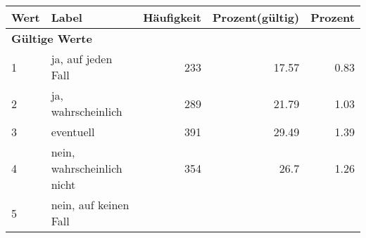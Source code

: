      \begin{longtable}{lXrrr}
     \toprule
     \textbf{Wert} & \textbf{Label} & \textbf{Häufigkeit} & \textbf{Prozent(gültig)} & \textbf{Prozent} \\
     \endhead
     \midrule
     \multicolumn{5}{l}{\textbf{Gültige Werte}}\\

     1 &
     \multicolumn{1}{X}{ ja, auf jeden Fall   } &


       \num{233} &
       \num[round-mode=places,round-precision=2]{17,57} &
         \num[round-mode=places,round-precision=2]{0,83} \\

     2 &
     \multicolumn{1}{X}{ ja, wahrscheinlich   } &


       \num{289} &
       \num[round-mode=places,round-precision=2]{21,79} &
         \num[round-mode=places,round-precision=2]{1,03} \\

     3 &
     \multicolumn{1}{X}{ eventuell   } &


       \num{391} &
       \num[round-mode=places,round-precision=2]{29,49} &
         \num[round-mode=places,round-precision=2]{1,39} \\

     4 &
     \multicolumn{1}{X}{ nein, wahrscheinlich nicht   } &


       \num{354} &
       \num[round-mode=places,round-precision=2]{26,7} &
         \num[round-mode=places,round-precision=2]{1,26} \\

     5 &
     \multicolumn{1}{X}{ nein, auf keinen Fall   } &



\end{longtable}
